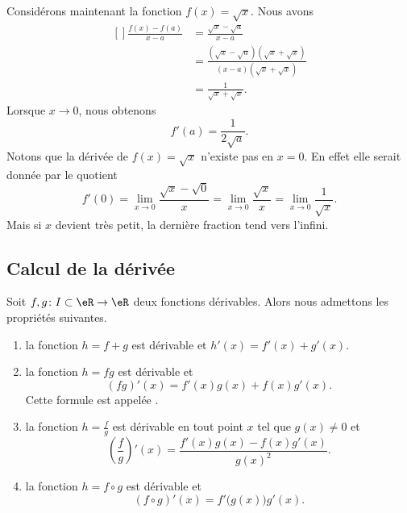 Considérons maintenant la fonction $f(x)=\sqrt{x}$. Nous avons
\begin{equation}
	\begin{aligned}[]
		\frac{ f(x)-f(a) }{ x-a }&=\frac{ \sqrt{x}-\sqrt{a} }{ x-a }\\
		&=\frac{ (\sqrt{x}-\sqrt{a})(\sqrt{x}+\sqrt{x}) }{ (x-a)(\sqrt{x}+\sqrt{x}) }\\
		&=\frac{1}{ \sqrt{x}+\sqrt{x} }.
	\end{aligned}
\end{equation}
Lorsque $x\to 0$, nous obtenons
\begin{equation}
	f'(a)=\frac{1}{ 2\sqrt{a} }.
\end{equation}
Notons que la dérivée de $f(x)=\sqrt{x}$ n'existe pas en $x=0$. En effet elle serait donnée par le quotient
\begin{equation}
	f'(0)=\lim_{x\to 0} \frac{ \sqrt{x}-\sqrt{0} }{ x }=\lim_{x\to 0} \frac{ \sqrt{x} }{ x }=\lim_{x\to 0} \frac{1}{ \sqrt{x} }.
\end{equation}
Mais si $x$ devient très petit, la dernière fraction tend vers l'infini.

\subsection{Calcul de la dérivée}

Soit $f,g\colon I\subset\eR\to\eR $ deux fonctions dérivables. Alors nous admettons les propriétés suivantes.
\begin{enumerate}
	\item
		la fonction $h=f+g$ est dérivable et $h'(x)=f'(x)+g'(x)$.
	\item
		la fonction $h=fg$ est dérivable et 
		\begin{equation}
			(fg)'(x)=f'(x)g(x)+f(x)g'(x).
		\end{equation}
		Cette formule est appelée .
	\item
		la fonction $h=\frac{ f }{ g }$ est dérivable en tout point $x$ tel que $g(x)\neq 0$ et 
		\begin{equation}
			\left( \frac{ f }{ g } \right)'(x)=\frac{ f'(x)g(x)-f(x)g'(x) }{ g(x)^2 }.
		\end{equation}
	\item
		la fonction $h=f\circ g$ est dérivable et 
		\begin{equation}
			(f\circ g)'(x)=f'\big( g(x) \big)g'(x).
		\end{equation}
		
\end{enumerate}

